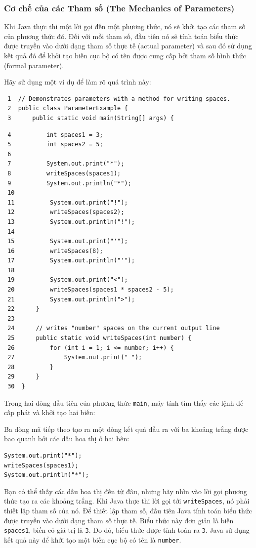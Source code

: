 \subsubsection{Cơ chế của các Tham số (The Mechanics of
Parameters)}\label{cux1a1-chux1ebf-cux1ee7a-cuxe1c-tham-sux1ed1-the-mechanics-of-parameters}

Khi Java thực thi một lời gọi đến một phương thức, nó sẽ khởi tạo các
tham số của phương thức đó. Đối với mỗi tham số, đầu tiên nó sẽ tính
toán biểu thức được truyền vào dưới dạng tham số thực tế (actual
parameter) và sau đó sử dụng kết quả đó để khởi tạo biến cục bộ có tên
được cung cấp bởi tham số hình thức (formal parameter).

Hãy sử dụng một ví dụ để làm rõ quá trình này:

\begin{verbatim}
 1  // Demonstrates parameters with a method for writing spaces.
 2  public class ParameterExample {
 3      public static void main(String[] args) {
\end{verbatim}

\begin{verbatim}
 4          int spaces1 = 3;
 5          int spaces2 = 5;
 6
 7          System.out.print("*");
 8          writeSpaces(spaces1);
 9          System.out.println("*");
 10
 11          System.out.print("!");
 12          writeSpaces(spaces2);
 13          System.out.println("!");
 14
 15          System.out.print("'");
 16          writeSpaces(8);
 17          System.out.println("'");
 18
 19          System.out.print("<");
 20          writeSpaces(spaces1 * spaces2 - 5);
 21          System.out.println(">");
 22      }
 23
 24      // writes "number" spaces on the current output line
 25      public static void writeSpaces(int number) {
 26          for (int i = 1; i <= number; i++) {
 27              System.out.print(" ");
 28          }
 29      }
 30  }
\end{verbatim}

Trong hai dòng đầu tiên của phương thức \texttt{main}, máy tính tìm thấy
các lệnh để cấp phát và khởi tạo hai biến:

Ba dòng mã tiếp theo tạo ra một dòng kết quả đầu ra với ba khoảng trắng
được bao quanh bởi các dấu hoa thị ở hai bên:

\begin{verbatim}
System.out.print("*");
writeSpaces(spaces1);
System.out.println("*");
\end{verbatim}

Bạn có thể thấy các dấu hoa thị đến từ đâu, nhưng hãy nhìn vào lời gọi
phương thức tạo ra các khoảng trắng. Khi Java thực thi lời gọi tới
\texttt{writeSpaces}, nó phải thiết lập tham số của nó. Để thiết lập
tham số, đầu tiên Java tính toán biểu thức được truyền vào dưới dạng
tham số thực tế. Biểu thức này đơn giản là biến \texttt{spaces1}, biến
có giá trị là \texttt{3}. Do đó, biểu thức được tính toán ra \texttt{3}.
Java sử dụng kết quả này để khởi tạo một biến cục bộ có tên là
\texttt{number}.

